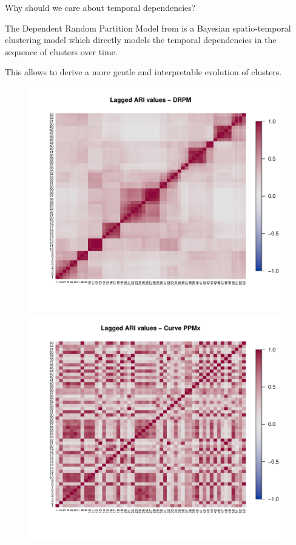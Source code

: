 \documentclass[
	11pt, %
 xcolor={dvipsnames,svgnames}
]{beamer}
\let\cite\citep
\begin{document}
\begin{frame}{Why should we care about temporal dependencies?}

\begin{block}{}
The \alert{Dependent} Random Partition Model from \cite{1-drpm} is a Bayesian spatio-temporal clustering model which        \alert{directly models the temporal dependencies in the sequence of clusters over time.}
\end{block}
This allows to derive a more gentle and interpretable evolution of clusters.
\begin{figure}
    \centering
    \includegraphics[clip,trim=50px 60px 17px 24px, width=0.45\linewidth]{imgs/ari_drpm.pdf}
    \includegraphics[clip,trim=50px 60px 17px 24px, width=0.45\linewidth]{imgs/ari_curveppmx.pdf}
\end{figure}
\end{frame}
\end{document}
